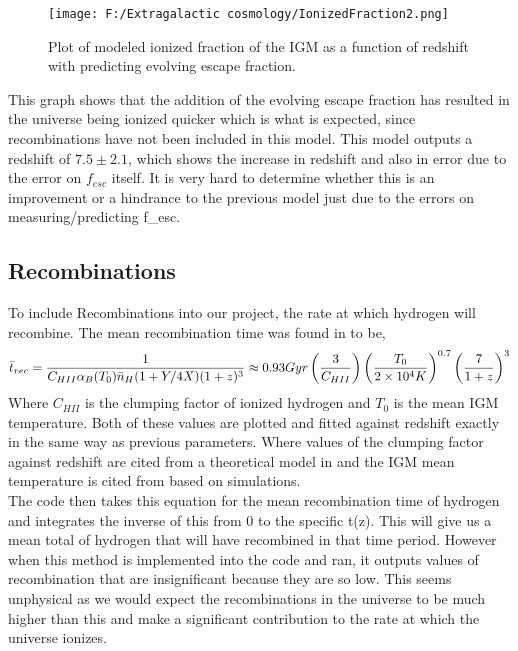 \documentclass{article}
\begin{document}
\begin{figure}
	\centering
		\texttt{[image: F:/Extragalactic cosmology/IonizedFraction2.png]}
		\caption{Plot of modeled ionized fraction of the IGM as a function of redshift with predicting evolving escape fraction.} 
	\label{fig:IonizedFraction2}
\end{figure}

This graph shows that the addition of the evolving escape fraction has resulted in the universe being ionized quicker which is what is expected, since recombinations have not been included in this model. This model outputs a redshift of $7.5\pm2.1$, which shows the increase in redshift and also in error due to the error on $f_{esc}$ itself. It is very hard to determine whether this is an improvement or a hindrance to the previous model just due to the errors on measuring/predicting f_{esc}.\\

\subsection{Recombinations}
To include Recombinations into our project, the rate at which hydrogen will recombine. The mean recombination time was found in \cite{2012MNRAS.423..862K} to be, 
\begin{equation} 
\bar{t}_{rec}= \frac{1}{C_{HII}\alpha_{B}(T_{0})\bar{n}_{H}(1+Y/4X)(1+z)^{3}}\\
\approx 0.93Gyr\left(\frac{3}{C_{HII}}\right)\left(\frac{T_{0}}{2\times 10^{4}K}\right)^{0.7}\left(\frac{7}{1+z}\right)^{3}
\end{equation}
Where $C_{HII}$ is the clumping factor of ionized hydrogen and $T_{0}$ is the mean IGM temperature. Both of these values are plotted and fitted against redshift exactly in the same way as previous parameters. Where values of the clumping factor against redshift are cited from a theoretical model in \cite{2011MNRAS.412L..16R} and the IGM mean temperature is cited from \cite{2006MNRAS.373.1265O} based on simulations.\\
The code then takes this equation for the mean recombination time of hydrogen and integrates the inverse of this from 0 to the specific t(z). This will give us a mean total of hydrogen that will have recombined in that time period. However when this method is implemented into the code and ran, it outputs values of recombination that are insignificant because they are so low. This seems unphysical as we would expect the recombinations in the universe to be much higher than this and make a significant contribution to the rate at which the universe ionizes.\\ 
\end{document}
